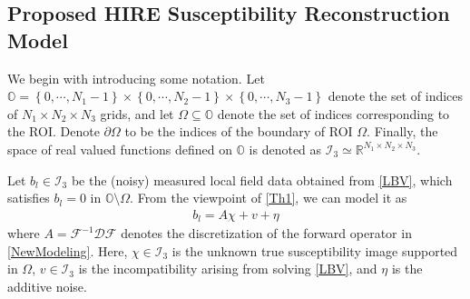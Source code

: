 \documentclass[reqno]{siamonline1116}
\numberwithin{theorem}{section}
\numberwithin{equation}{section}
\def\R{{\mathbb R}}
\def\OO{{\mathbb O}}
\def\Om{\Omega}
\def\p{\partial}
\def\mD{{\mathcal D}}
\def\mI{{\mathcal I}}
\def\msF{{\mathscr F}}
\begin{document}
\subsection{Proposed HIRE Susceptibility Reconstruction Model}\label{ProposedHIREModel}

We begin with introducing some notation. Let $\OO=\left\{0,\cdots,N_1-1\right\}\times\left\{0,\cdots,N_2-1\right\}\times\left\{0,\cdots,N_3-1\right\}$ denote the set of indices of $N_1\times N_2\times N_3$ grids, and let $\Om\subseteq\OO$ denote the set of indices corresponding to the ROI. Denote $\p\Om$ to be the indices of the boundary of ROI $\Om$. Finally, the space of real valued functions defined on $\OO$ is denoted as $\mI_3\simeq\R^{N_1\times N_2\times N_3}$.

Let $b_l\in\mI_3$ be the (noisy) measured local field data obtained from \cref{LBV}, which satisfies $b_l=0$ in $\OO\setminus\Om$. From the viewpoint of \cref{Th1}, we can model it as
\begin{align*}
b_l=A\chi+v+\eta
\end{align*}
where $A=\msF^{-1}\mD\msF$ denotes the discretization of the forward operator in \cref{NewModeling}. Here, $\chi\in\mI_3$ is the unknown true susceptibility image supported in $\Om$, $v\in\mI_3$ is the incompatibility arising from solving \cref{LBV}, and $\eta$ is the additive noise.


\end{document}

